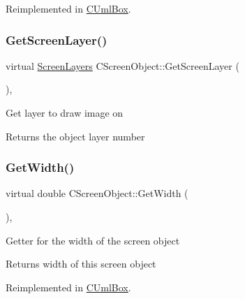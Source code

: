 Reimplemented in \mbox{\hyperlink{class_c_uml_box_a41f93630b86229a23274b14b7308b1f8}{C\+Uml\+Box}}.

\mbox{\label{class_c_screen_object_a1a570970d440543b1cfebc1dac9c3efa}} 
\subsubsection{\texorpdfstring{GetScreenLayer()}{GetScreenLayer()}}
{\footnotesize\ttfamily virtual \mbox{\hyperlink{_screen_layers_8h_ac283065f0e546466dc00cf224c28d5ac}{Screen\+Layers}} C\+Screen\+Object\+::\+Get\+Screen\+Layer (\begin{DoxyParamCaption}{ }\end{DoxyParamCaption})\hspace{0.3cm}{\ttfamily [inline]}, {\ttfamily [virtual]}}

Get layer to draw image on \begin{DoxyReturn}{Returns}
the object layer number 
\end{DoxyReturn}
\mbox{\label{class_c_screen_object_ac32f1b9ea19e703276b2a8880edd4022}} 
\subsubsection{\texorpdfstring{GetWidth()}{GetWidth()}}
{\footnotesize\ttfamily virtual double C\+Screen\+Object\+::\+Get\+Width (\begin{DoxyParamCaption}{ }\end{DoxyParamCaption})\hspace{0.3cm}{\ttfamily [inline]}, {\ttfamily [virtual]}}

Getter for the width of the screen object \begin{DoxyReturn}{Returns}
width of this screen object 
\end{DoxyReturn}


Reimplemented in \mbox{\hyperlink{class_c_uml_box_a511859ee5042e1af916947bd22c5c18a}{C\+Uml\+Box}}.

\mbox{\label{class_c_screen_object_ae39daf9e1080c65e93bdecb87573b984}} 
